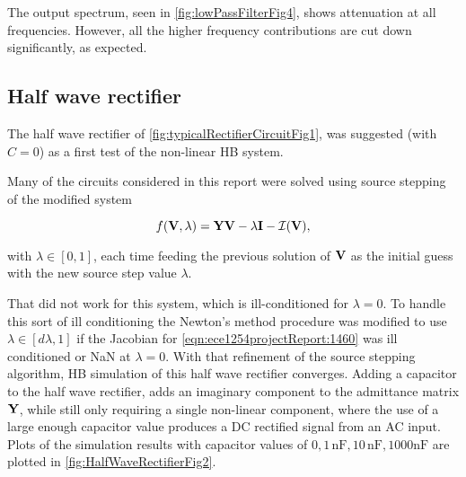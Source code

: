 The output spectrum, seen in \cref{fig:lowPassFilterFig4},
shows attenuation at all frequencies.
However, all the higher frequency contributions are cut down significantly, as expected.


\subsection{Half wave rectifier}

The half wave rectifier of \cref{fig:typicalRectifierCircuitFig1}, was suggested (with \( C = 0 \)) as a first test of the non-linear HB system.


Many of the circuits considered in this report were solved using source stepping of the modified system

\begin{equation}\label{eqn:ece1254projectReport:1460}
f(\BV, \lambda) = \BY \BV - \lambda \BI - \mathcal{I}(\BV),
\end{equation}

with \( \lambda \in [0, 1] \), each time feeding the previous solution of \( \mathbf{V} \) as the initial guess with the new source step value \( \lambda \).

That did not work for this system, which is ill-conditioned for \( \lambda = 0 \).
To handle this sort of ill conditioning the Newton's method procedure was modified to use \( \lambda \in [d\lambda, 1] \) if the Jacobian for \cref{eqn:ece1254projectReport:1460} was ill conditioned or NaN at \( \lambda = 0 \).
With that refinement of the source stepping algorithm, HB simulation of this half wave rectifier converges.
Adding a capacitor to the half wave rectifier, adds an imaginary component to the admittance matrix \( \mathbf{Y} \), while still only requiring a single non-linear component, where the use of a large enough capacitor value produces a DC rectified signal from an AC input.
Plots of the simulation results with
capacitor values of \( 0, 1 \, \text{nF}, 10 \, \text{nF}, 1000 \text{nF} \) are plotted in \cref{fig:HalfWaveRectifierFig2}.

